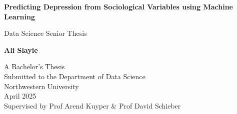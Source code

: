 \begin{titlepage}
\centering
\vspace*{2cm}

\Huge\textbf{Predicting Depression from Sociological Variables using Machine Learning}

\vspace{1cm}
\Large
Data Science Senior Thesis

\vspace{2cm}
\textbf{Ali Slayie}

\vfill

A Bachelor’s Thesis\\
Submitted to the Department of Data Science\\
Northwestern University\\
April 2025\\
Supervised by Prof Arend Kuyper \& Prof David Schieber

\end{titlepage}
\newpage

